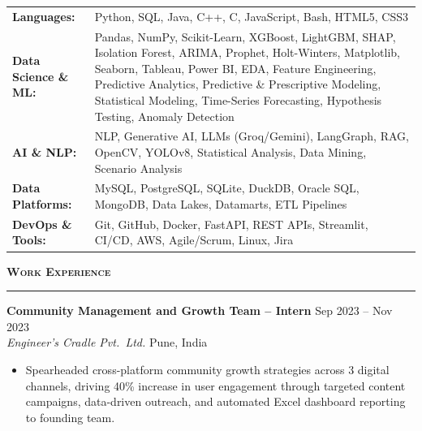 \documentclass[a4paper,10pt]{article}
\newcommand{\sectionHeader}[2]{%
  \vspace{5pt}%
  \noindent%
  {\normalsize\bfseries\color{HeaderDark}#2\enspace\textsc{#1}}%
  \\[-6pt]%
  {\color{SectionLine}\rule{\textwidth}{1pt}}%
  \vspace{1pt}\par%
}
\newcommand{\expEntry}[4]{%
  \vspace{1pt}%
  \noindent\textbf{\color{HeaderDark}#1} \hfill {\small\color{SubText}#2}\\[-3pt]%
  {\small\color{MidGray}\textit{#3}} \hfill {\small\color{SubText}#4}%
  \vspace{0pt}\par%
}
\begin{document}
\vspace{1pt}
\begin{tabularx}{\textwidth}{@{}l X@{}}
  {\small\textbf{\color{HeaderDark}Languages:}} & {\small Python, SQL, Java, C++, C, JavaScript, Bash, HTML5, CSS3} \\[2pt]
  {\small\textbf{\color{HeaderDark}Data Science \& ML:}} & {\small Pandas, NumPy, Scikit-Learn, XGBoost, LightGBM, SHAP, Isolation Forest, ARIMA, Prophet, Holt-Winters, Matplotlib, Seaborn, Tableau, Power BI, EDA, Feature Engineering, Predictive Analytics, Predictive \& Prescriptive Modeling, Statistical Modeling, Time-Series Forecasting, Hypothesis Testing, Anomaly Detection} \\[2pt]
  {\small\textbf{\color{HeaderDark}AI \& NLP:}} & {\small NLP, Generative AI, LLMs (Groq/Gemini), LangGraph, RAG, OpenCV, YOLOv8, Statistical Analysis, Data Mining, Scenario Analysis} \\[2pt]
  {\small\textbf{\color{HeaderDark}Data Platforms:}} & {\small MySQL, PostgreSQL, SQLite, DuckDB, Oracle SQL, MongoDB, Data Lakes, Datamarts, ETL Pipelines} \\[2pt]
  {\small\textbf{\color{HeaderDark}DevOps \& Tools:}} & {\small Git, GitHub, Docker, FastAPI, REST APIs, Streamlit, CI/CD, AWS, Agile/Scrum, Linux, Jira} \\
\end{tabularx}


\sectionHeader{Work Experience}{\faLaptopCode}

\expEntry{Community Management and Growth Team -- Intern}
  {Sep 2023 -- Nov 2023}
  {Engineer's Cradle Pvt.\ Ltd.}
  {Pune, India}

\begin{itemize}[leftmargin=14pt, itemsep=0pt, parsep=0pt, topsep=1pt, label={\color{BulletColor}\textbf{--}}]
  \item {\small Spearheaded cross-platform community growth strategies across 3 digital channels, driving 40\% increase in user engagement through targeted content campaigns, data-driven outreach, and automated Excel dashboard reporting to founding team.}
\end{itemize}

\end{document}
